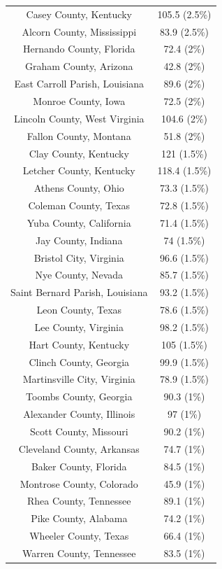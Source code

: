 \begin{table}[ht]
\begin{tabular}{cc}
  Casey County, Kentucky & 105.5 (2.5\%) \\ 
  Alcorn County, Mississippi & 83.9 (2.5\%) \\ 
  Hernando County, Florida & 72.4 (2\%) \\ 
  Graham County, Arizona & 42.8 (2\%) \\ 
  East Carroll Parish, Louisiana & 89.6 (2\%) \\ 
  Monroe County, Iowa & 72.5 (2\%) \\ 
  Lincoln County, West Virginia & 104.6 (2\%) \\ 
  Fallon County, Montana & 51.8 (2\%) \\ 
  Clay County, Kentucky & 121 (1.5\%) \\ 
  Letcher County, Kentucky & 118.4 (1.5\%) \\ 
  Athens County, Ohio & 73.3 (1.5\%) \\ 
  Coleman County, Texas & 72.8 (1.5\%) \\ 
  Yuba County, California & 71.4 (1.5\%) \\ 
  Jay County, Indiana & 74 (1.5\%) \\ 
  Bristol City, Virginia & 96.6 (1.5\%) \\ 
  Nye County, Nevada & 85.7 (1.5\%) \\ 
  Saint Bernard Parish, Louisiana & 93.2 (1.5\%) \\ 
  Leon County, Texas & 78.6 (1.5\%) \\ 
  Lee County, Virginia & 98.2 (1.5\%) \\ 
  Hart County, Kentucky & 105 (1.5\%) \\ 
  Clinch County, Georgia & 99.9 (1.5\%) \\ 
  Martinsville City, Virginia & 78.9 (1.5\%) \\ 
  Toombs County, Georgia & 90.3 (1\%) \\ 
  Alexander County, Illinois & 97 (1\%) \\ 
  Scott County, Missouri & 90.2 (1\%) \\ 
  Cleveland County, Arkansas & 74.7 (1\%) \\ 
  Baker County, Florida & 84.5 (1\%) \\ 
  Montrose County, Colorado & 45.9 (1\%) \\ 
  Rhea County, Tennessee & 89.1 (1\%) \\ 
  Pike County, Alabama & 74.2 (1\%) \\ 
  Wheeler County, Texas & 66.4 (1\%) \\ 
  Warren County, Tennessee & 83.5 (1\%) \\ 

\end{tabular}
\end{table}
